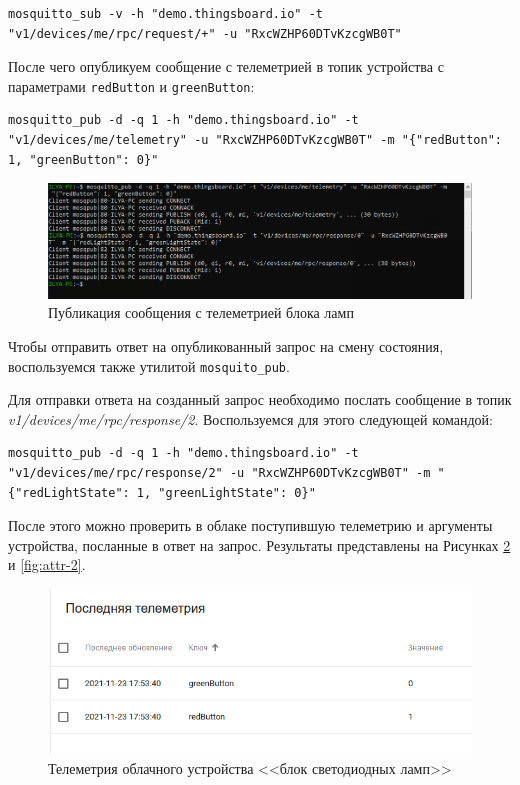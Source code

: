 \documentclass[utf8x]{G7-32} %
\begin{document}
\begin{lstlisting}
mosquitto_sub -v -h "demo.thingsboard.io" -t "v1/devices/me/rpc/request/+" -u "RxcWZHP60DTvKzcgWB0T"
\end{lstlisting}

После чего опубликуем сообщение с телеметрией в топик устройства с параметрами
\texttt{redButton} и \texttt{greenButton}:

\begin{lstlisting}
mosquitto_pub -d -q 1 -h "demo.thingsboard.io" -t "v1/devices/me/telemetry" -u "RxcWZHP60DTvKzcgWB0T" -m "{"redButton": 1, "greenButton": 0}"
\end{lstlisting}

\begin{figure}[h!]
	\centering
	\includegraphics[width=0.6\linewidth]{images/t2-sender}
	\caption{Публикация сообщения с телеметрией блока ламп}
	\label{fig:t2-sender}
\end{figure}

Чтобы отправить ответ на опубликованный запрос на смену состояния, воспользуемся
также утилитой \texttt{mosquito\_pub}.

Для отправки ответа на созданный запрос необходимо послать сообщение в топик
\textit{v1/devices/me/rpc/response/2}. Воспользуемся для этого следующей командой:

\begin{lstlisting}
mosquitto_pub -d -q 1 -h "demo.thingsboard.io" -t "v1/devices/me/rpc/response/2" -u "RxcWZHP60DTvKzcgWB0T" -m "{"redLightState": 1, "greenLightState": 0}"
\end{lstlisting}

После этого можно проверить в облаке поступившую телеметрию и аргументы устройства,
посланные в ответ на запрос. Результаты представлены на Рисунках \ref{fig:tel-2} и \ref{fig:attr-2}.

\begin{figure}[h!]
	\centering
	\includegraphics[width=0.6\linewidth]{images/tel-2}
	\caption{Телеметрия облачного устройства <<блок светодиодных ламп>>}
	\label{fig:tel-2}
\end{figure}
\end{document}
